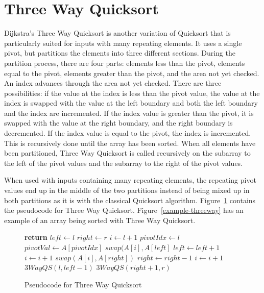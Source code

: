 \documentclass{article}
\begin{document}
\section{Three Way Quicksort}
Dijkstra's Three Way Quicksort is another variation of Quicksort that is particularly suited for
inputs with many repeating elements. It uses a single pivot, but partitions the elements into 
three different 
sections. During the partition process, there are four parts: elements less than the pivot, elements 
equal to the pivot, elements greater than the pivot, and the area not yet checked. An index 
advances through the area not yet checked. There are three possibilities: if the value at the 
index is less than the pivot value, the value at the index is swapped with the value at the 
left boundary and both the left boundary and the index are incremented. If the index value is 
greater than the pivot, it is swapped with the value at the right boundary, and the right boundary
is decremented. If the index value is equal to the pivot, the index is incremented. This is 
recursively done until the array has been sorted. When all elements have been partitioned,
Three Way Quicksort is called recursively on the subarray to the left of the pivot values
and the subarray to the right of the pivot values. 

When used with inputs containing many repeating elements, the repeating pivot values
end up in the middle of the two partitions instead of being mixed up in both partitions as it is
with the classical Quicksort algorithm.
Figure~\ref{pseudo-threeway} contains the pseudocode for Three Way Quicksort. 
Figure~\ref{example-threeway} has an example of an array being sorted with Three Way
Quicksort.

\begin{figure}
\begin{algorithmic}
			\State \textbf{return}
		\EndIf
		\State $left \gets l$
		\State $right \gets r$
		\State $i \gets l + 1$
		\State $pivotIdx \gets l$
		\State $pivotVal \gets A[pivotIdx]$
				\State $swap(A[i], A[left]$
    				\State $left \gets left + 1$
    				\State $i \gets i + 1$
  			\Else
					\State $swap(A[i], A[right])$
    					\State $right \gets right - 1$
  				\Else
    					\State $i \gets i + 1$
				\EndIf
			\EndIf
		\EndWhile
		\State $3WayQS(l, left - 1)$
		\State $3WayQS(right + 1, r)$
	\EndProcedure
\end{algorithmic}
\caption{Pseudocode for Three Way Quicksort}
\label{pseudo-threeway}
\end{figure}
\end{document}
